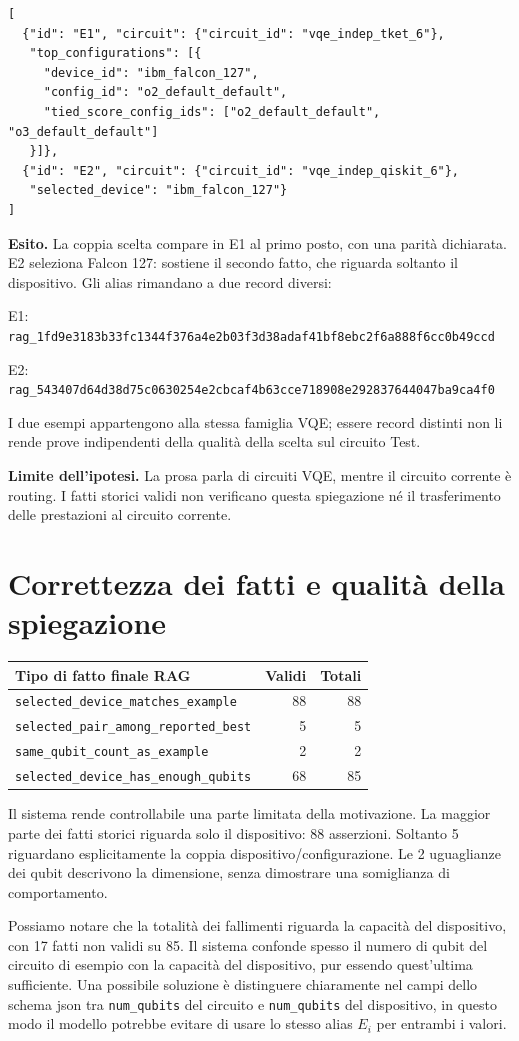 \documentclass[a4paper,10pt]{article}
\newcommand{\tagline}[1]{{\small\color{ink}\textbf{#1}}\par}
\begin{document}
\begin{lstlisting}
[
  {"id": "E1", "circuit": {"circuit_id": "vqe_indep_tket_6"},
   "top_configurations": [{
     "device_id": "ibm_falcon_127",
     "config_id": "o2_default_default",
     "tied_score_config_ids": ["o2_default_default", "o3_default_default"]
   }]},
  {"id": "E2", "circuit": {"circuit_id": "vqe_indep_qiskit_6"},
   "selected_device": "ibm_falcon_127"}
]
\end{lstlisting}
\textbf{Esito.} La coppia scelta compare in E1 al primo posto, con una parità dichiarata. E2 seleziona Falcon 127: sostiene il secondo fatto, che riguarda soltanto il dispositivo. Gli alias rimandano a due record diversi:\par
{\footnotesize E1: \texttt{rag\_1fd9e3183b33fc1344f376a4e2b03f3d38adaf41bf8ebc2f6a888f6cc0b49ccd}}\par
{\footnotesize E2: \texttt{rag\_543407d64d38d75c0630254e2cbcaf4b63cce718908e292837644047ba9ca4f0}}\par
I due esempi appartengono alla stessa famiglia VQE; essere record distinti non li rende prove indipendenti della qualità della scelta sul circuito Test.\par
{\color{warn}\textbf{Limite dell'ipotesi.}} La prosa parla di circuiti VQE, mentre il circuito corrente è routing. I fatti storici validi non verificano questa spiegazione né il trasferimento delle prestazioni al circuito corrente.\par
\newpage\tagline{PORTATA DEI RISULTATI E RIPRODUCIBILITÀ}
\section*{Correttezza dei fatti e qualità della spiegazione}
\begin{tabularx}{\linewidth}{Xrr}\toprule Tipo di fatto finale RAG & Validi & Totali\\\midrule
\texttt{selected\_device\_matches\_example} & 88 & 88\\
\texttt{selected\_pair\_among\_reported\_best} & 5 & 5\\
\texttt{same\_qubit\_count\_as\_example} & 2 & 2\\
\texttt{selected\_device\_has\_enough\_qubits} & 68 & 85\\
\bottomrule\end{tabularx}\par
Il sistema rende controllabile una parte limitata della motivazione. La maggior parte dei fatti storici riguarda solo il dispositivo: 88 asserzioni. Soltanto 5 riguardano esplicitamente la coppia dispositivo/configurazione. Le 2 uguaglianze dei qubit descrivono la dimensione, senza dimostrare una somiglianza di comportamento.\par
Possiamo notare che la totalità dei fallimenti riguarda la capacità del dispositivo, con 17 fatti non validi su 85. Il sistema confonde spesso il numero di qubit del circuito di esempio con la capacità del dispositivo, pur essendo quest'ultima sufficiente. 
Una possibile soluzione è distinguere chiaramente nel campi dello schema json tra \texttt{num\_qubits} del circuito e \texttt{num\_qubits} del dispositivo, in questo modo il modello potrebbe evitare di usare lo stesso alias $E_i$ per entrambi i valori.\par
\end{document}
